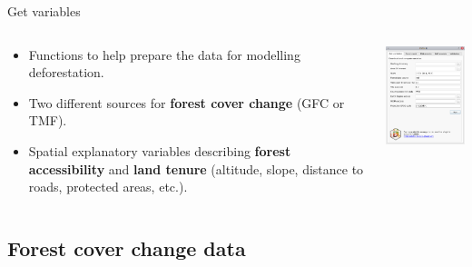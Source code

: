 \documentclass[10pt,table,dvipsnames,compress]{beamer}
\begin{document}
\begin{frame}[label={sec:orgf7a27fd}]{Get variables}
\begin{columns}
\begin{column}{0.5\columnwidth}
\begin{itemize}
\item Functions to help prepare the data for modelling deforestation.
\item Two different sources for \textbf{forest cover change} (GFC or TMF).
\item Spatial explanatory variables describing \textbf{forest accessibility} and
\textbf{land tenure} (altitude, slope, distance to roads, protected areas, etc.).
\end{itemize}
\end{column}

\begin{column}{0.5\columnwidth}
\begin{center}
\includegraphics[width=5cm]{figs/plugin_api/interface_variables.png}
\end{center}
\end{column}
\end{columns}
\end{frame}

\subsection{Forest cover change data}
\label{sec:org7f33108}
\end{document}
